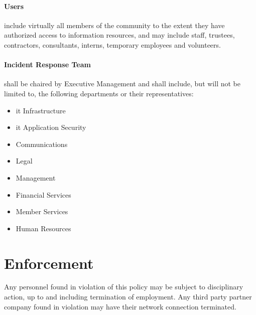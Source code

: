 \paragraph{Users} include virtually all members of the \OrganizationName{} community to the extent they have authorized access to information resources, and may include staff, trustees, contractors, consultants, interns, temporary employees and volunteers.
\paragraph{Incident Response Team} shall be chaired by Executive Management and shall include, but will not be limited to, the following departments or their representatives:
\begin{itemize}
\item
\gls{it} Infrastructure
\item
\gls{it} Application Security
\item
Communications
\item
Legal
\item
Management
\item
Financial Services
\item
Member Services
\item
Human Resources
\end{itemize}

\section{Enforcement}
Any \OrganizationName{} personnel found in violation of this policy may be subject to disciplinary action, up to and including termination of employment.  
Any third party partner company found in violation may have their network connection terminated. 

